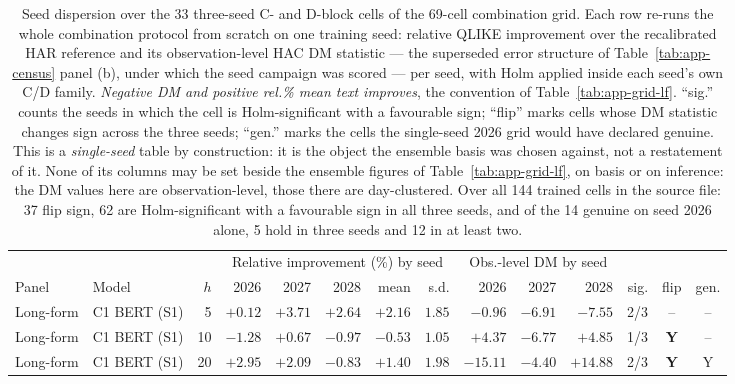 \begin{table}[p]
\centering
\caption[Seed dispersion over the three-seed grid cells]{Seed dispersion
over the 33 three-seed C- and D-block cells of the 69-cell combination
grid. Each row re-runs the whole combination protocol from scratch on one
training seed: relative QLIKE improvement over the recalibrated HAR
reference and its observation-level HAC DM statistic --- the superseded
error structure of Table~\ref{tab:app-census} panel (b), under which the
seed campaign was scored --- per seed, with Holm applied
inside each seed's own C/D family. \emph{Negative DM and positive rel.\%
mean text improves}, the convention of Table~\ref{tab:app-grid-lf}.
``sig.'' counts the seeds in which the cell is Holm-significant with a
favourable sign; ``flip'' marks cells whose DM statistic changes sign
across the three seeds; ``gen.'' marks the cells the single-seed 2026 grid
would have declared genuine. This is a \emph{single-seed} table by
construction: it is the object the ensemble basis was chosen against,
not a restatement of it. None of its columns may be set beside the
ensemble figures of Table~\ref{tab:app-grid-lf}, on basis or on
inference: the DM values here are observation-level, those there are
day-clustered. Over all 144 trained cells
in the source file: 37 flip sign, 62 are Holm-significant with a favourable
sign in all three seeds, and of the 14 genuine on seed 2026 alone, 5 hold
in three seeds and 12 in at least two.}
\label{tab:app-seeds}
\singlespacing\footnotesize
\setlength{\tabcolsep}{1.5pt}
\begin{tabular}{@{}llrrrrrrrrrrcc@{}}
\toprule
& & & \multicolumn{5}{c}{Relative improvement (\%) by seed} & \multicolumn{3}{c}{Obs.-level DM by seed} & & & \\
\cmidrule(lr){4-8}\cmidrule(lr){9-11}
Panel & Model & $h$ & 2026 & 2027 & 2028 & mean & s.d. & 2026 & 2027 & 2028 & sig. & flip & gen. \\
\midrule
Long-form & C1 BERT (S1) & 5 & $+0.12$ & $+3.71$ & $+2.64$ & $+2.16$ & $1.85$ & $-0.96$ & $-6.91$ & $-7.55$ & 2/3 & -- & -- \\
Long-form & C1 BERT (S1) & 10 & $-1.28$ & $+0.67$ & $-0.97$ & $-0.53$ & $1.05$ & $+4.37$ & $-6.77$ & $+4.85$ & 1/3 & \textbf{Y} & -- \\
Long-form & C1 BERT (S1) & 20 & $+2.95$ & $+2.09$ & $-0.83$ & $+1.40$ & $1.98$ & $-15.11$ & $-4.40$ & $+14.88$ & 2/3 & \textbf{Y} & Y \\

\end{tabular}
\end{table}
